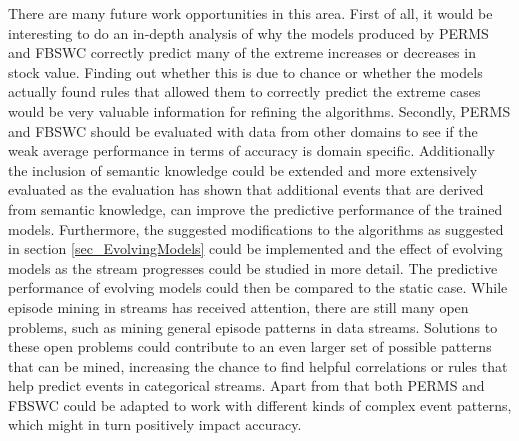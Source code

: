 There are many future work opportunities in this area. First of all, it would be interesting to do an in-depth analysis of why the models produced by PERMS and FBSWC correctly predict many of the extreme increases or decreases in stock value. Finding out whether this is due to chance or whether the models actually found rules that allowed them to correctly predict the extreme cases would be very valuable information for refining the algorithms. Secondly, PERMS and FBSWC should be evaluated with data from other domains to see if the weak average performance in terms of accuracy is domain specific. Additionally the inclusion of semantic knowledge could be extended and more extensively evaluated as the evaluation has shown that additional events that are derived from semantic knowledge, can improve the predictive performance of the trained models. Furthermore, the suggested modifications to the algorithms as suggested in section \ref{sec_EvolvingModels} could be implemented and the effect of evolving models as the stream progresses could be studied in more detail. The predictive performance of evolving models could then be compared to the static case. While episode mining in streams has received attention, there are still many open problems, such as mining general episode patterns in data streams. Solutions to these open problems could contribute to an even larger set of possible patterns that can be mined, increasing the chance to find helpful correlations or rules that help predict events in categorical streams. Apart from that both PERMS and FBSWC could be adapted to work with different kinds of complex event patterns, which might in turn positively impact accuracy.